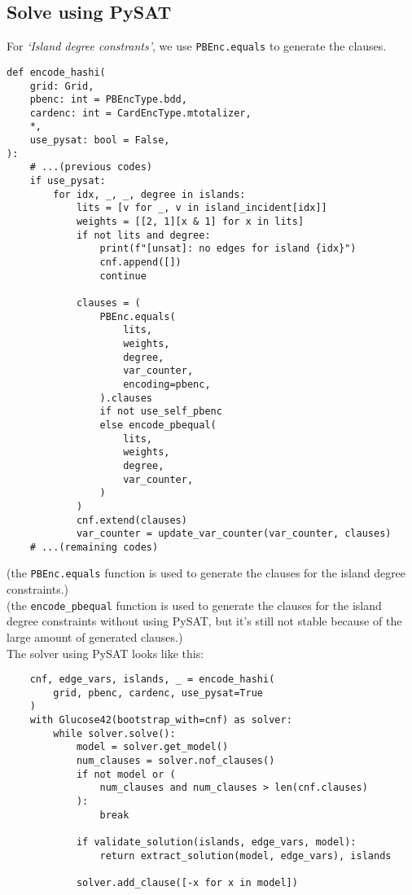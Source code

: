 \subsection{Solve using PySAT}
\begin{flushleft}
    For \textit{`Island degree constrants'}, we use \verb|PBEnc.equals| to generate the clauses.
    \begin{verbatim}
def encode_hashi(
    grid: Grid,
    pbenc: int = PBEncType.bdd,
    cardenc: int = CardEncType.mtotalizer,
    *,
    use_pysat: bool = False,
):
    # ...(previous codes)
    if use_pysat:
        for idx, _, _, degree in islands:
            lits = [v for _, v in island_incident[idx]]
            weights = [[2, 1][x & 1] for x in lits]
            if not lits and degree:
                print(f"[unsat]: no edges for island {idx}")
                cnf.append([])
                continue

            clauses = (
                PBEnc.equals(
                    lits,
                    weights,
                    degree,
                    var_counter,
                    encoding=pbenc,
                ).clauses
                if not use_self_pbenc
                else encode_pbequal(
                    lits,
                    weights,
                    degree,
                    var_counter,
                )
            )
            cnf.extend(clauses)
            var_counter = update_var_counter(var_counter, clauses)
    # ...(remaining codes)
\end{verbatim}
    (the \verb|PBEnc.equals| function is used to generate the clauses for the island degree constraints.)\\
    (the \verb|encode_pbequal| function is used to generate the clauses for the island degree constraints without using PySAT, but it's still not stable because of the large amount of generated clauses\@.)
    \\[2\baselineskip]
    The solver using PySAT looks like this:
    \begin{verbatim}
    cnf, edge_vars, islands, _ = encode_hashi(
        grid, pbenc, cardenc, use_pysat=True
    )
    with Glucose42(bootstrap_with=cnf) as solver:
        while solver.solve():
            model = solver.get_model()
            num_clauses = solver.nof_clauses()
            if not model or (
                num_clauses and num_clauses > len(cnf.clauses)
            ):
                break

            if validate_solution(islands, edge_vars, model):
                return extract_solution(model, edge_vars), islands

            solver.add_clause([-x for x in model])
\end{verbatim}
\end{flushleft}
